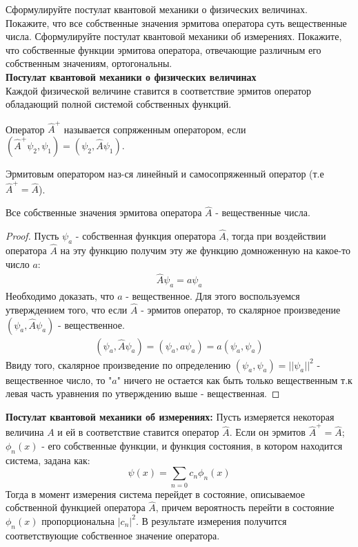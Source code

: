 \documentclass[__main__.tex]{subfiles}
\begin{document}
Сформулируйте постулат квантовой механики о физических величинах. Покажите, что все собственные значения эрмитова оператора суть вещественные числа. Сформулируйте постулат квантовой механики об измерениях. Покажите, что собственные функции эрмитова оператора, отвечающие различным его собственным значениям, ортогональны.\\

\textbf{Постулат квантовой механики о физических величинах}\\
Каждой физической величине ставится в соответствие эрмитов оператор обладающий полной системой собственных функций.
\begin{definition}
    Оператор $\hat{A}^+$ называется сопряженным оператором, если $(\hat{A}^+ \psi_2, \psi_1) = (\psi_2, \hat{A} \psi_1)$.
\end{definition}

\begin{definition}
    Эрмитовым оператором наз-ся линейный и самосопряженный оператор (т.е $\hat{A}^+ = \hat{A}$).
\end{definition}

\begin{statement}
    Все собственные значения эрмитова оператора $\hat{A}$ - вещественные числа.
\end{statement}
\begin{proof}
    Пусть $\psi_a$ - собственная функция оператора $\hat{A}$, тогда при воздействии оператора $\hat{A}$ на эту функцию получим эту же функцию домноженную на какое-то число $a$:
    \begin{gather*}
        \hat{A}\psi_a = a\psi_a
    \end{gather*}
    Необходимо доказать, что $a$ - вещественное. Для этого воспользуемся утверждением того, что если $\hat{A}$ - эрмитов оператор, то скалярное произведение $(\psi_a,\hat{A}\psi_a)$ - вещественное.
    \begin{gather*}
        (\psi_a,\hat{A}\psi_a) = (\psi_a,a\psi_a) = a(\psi_a,\psi_a)
    \end{gather*}
    Ввиду того, скалярное произведение по определению $(\psi_a,\psi_a) = \vert\vert\psi_a\vert\vert^2$ - вещественное число, то "$a$" ничего не остается как быть только вещественным т.к левая часть уравнения по утверждению выше  - вещественная.
\end{proof}

\textbf{Постулат квантовой механики об измерениях:}
Пусть измеряется некоторая величина $A$ и ей в соответствие ставится оператор $\hat{A}$. Если он эрмитов ${\hat{A}^+=\hat{A}}$; $\phi_n(x)$ - его собственные функции, и функция состояния, в котором находится система, задана как:
$$\psi(x)=\sum_{n=0}c_n\phi_n(x)$$
Тогда в момент измерения система перейдет в состояние, описываемое собственной функцией оператора $\hat{A}$, причем вероятность перейти в состояние $\phi_n(x)$ пропорциональна ${\left|c_n\right|}^2$. В результате измерения получится соответствующие собственное значение оператора.
\end{document}
